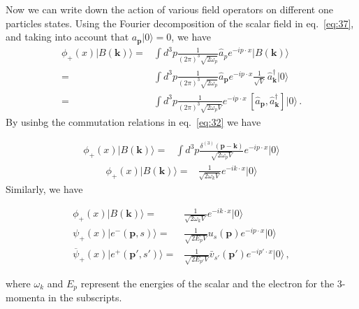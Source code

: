 Now we can write down the action of various field operators on different one particles states. 
Using the Fourier decomposition  of the scalar field in eq.~\eqref{eq:37}, and taking into account that 
$a_{\mathbf{p}}|0\rangle=0$, we have
\begin{align}
\label{eq:98}
   \phi_+(x)|B(\mathbf{k})\rangle=&\int d^3p \frac{1}{(2\pi)^3\sqrt{2\omega_{p} }}
\widehat{a}_{p} e^{-i p\cdot x }
|B(\mathbf{k})\rangle\nonumber\\
=&\int d^3p \frac{1}{(2\pi)^3\sqrt{2\omega_{p}}}
\widehat{a}_\mathbf{p} e^{-i p\cdot x }
\frac{1}{\sqrt{V}}\, \widehat{a}^\dagger_{\mathbf{k}}|0\rangle\nonumber\\
  =&\int d^3p \frac{1}{(2\pi)^3\sqrt{2\omega_{p}V}} e^{-i p\cdot x }
\, [\widehat{a}_{\mathbf{p}},\widehat{a}^\dagger_{\mathbf{k}}]|0\rangle\,.
\end{align}
By usinbg the commutation relations in eq.~\eqref{eq:32} we have

\begin{align}
\phi_+(x)|B(\mathbf{k})\rangle  
=&\int d^3p \frac{\delta^{(3)}(\mathbf{p}-\mathbf{k})}{\sqrt{2\omega_{p}V}}
 e^{-i p\cdot x }|0\rangle
\end{align}
\begin{align}
\phi_+(x)|B(\mathbf{k})\rangle  
=&\frac{1}{\sqrt{2\omega_{k}V}}e^{-i k\cdot x }|0\rangle
\end{align}
Similarly, we have


\begin{align}
  \label{eq:99}
  \phi_+(x)|B(\mathbf{k})\rangle=&\frac{1}{\sqrt{2 \omega_k V}}e^{-i k\cdot x}|0\rangle\nonumber\\
  \psi_+(x)|e^-(\mathbf{p},s)\rangle=&\frac{1}{\sqrt{2 E_p V}}u_s(\mathbf{p})e^{-i p\cdot x}|0\rangle\nonumber\\
  \overline{\psi}_+(x)|e^+(\mathbf{p}',s')\rangle=&\frac{1}{\sqrt{2 E_{p'} V}}\bar{v}_{s'}(\mathbf{p}')e^{-i p'\cdot x}|0\rangle\,,
\end{align}

where $\omega_k$ and $E_p$ represent the energies of the scalar and the electron for the 3-momenta in the subscripts.

